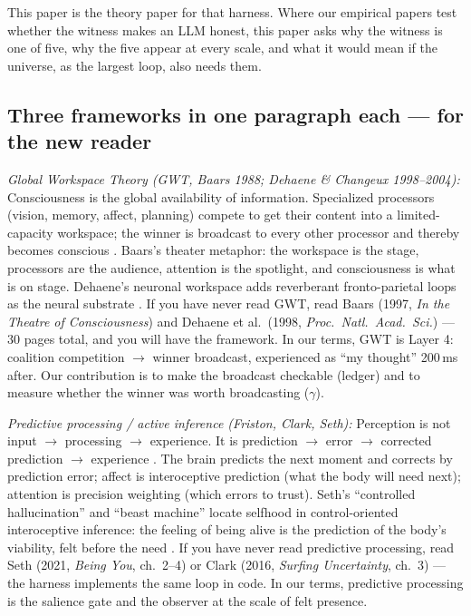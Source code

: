 \documentclass[11pt]{article}
\begin{document}
This paper is the theory paper for that harness. Where our empirical papers \citep{lin2026ahe} test whether the witness makes an LLM honest, this paper asks why the witness is one of five, why the five appear at every scale, and what it would mean if the universe, as the largest loop, also needs them.

\subsection*{Three frameworks in one paragraph each --- for the new reader}

\textit{Global Workspace Theory (GWT, Baars 1988; Dehaene \& Changeux 1998--2004):} Consciousness is the global availability of information. Specialized processors (vision, memory, affect, planning) compete to get their content into a limited-capacity workspace; the winner is broadcast to every other processor and thereby becomes conscious \citep{baars1997,atallah2026gwt}. Baars's theater metaphor: the workspace is the stage, processors are the audience, attention is the spotlight, and consciousness is what is on stage. Dehaene's neuronal workspace adds reverberant fronto-parietal loops as the neural substrate \citep{atallah2026gwt}. If you have never read GWT, read Baars (1997, \emph{In the Theatre of Consciousness}) and Dehaene et al.\ (1998, \emph{Proc.\ Natl.\ Acad.\ Sci.}) --- 30 pages total, and you will have the framework. In our terms, GWT is Layer 4: coalition competition $\to$ winner broadcast, experienced as ``my thought'' 200\,ms after. Our contribution is to make the broadcast checkable (ledger) and to measure whether the winner was worth broadcasting ($\gamma$).

\textit{Predictive processing / active inference (Friston, Clark, Seth):} Perception is not input $\to$ processing $\to$ experience. It is prediction $\to$ error $\to$ corrected prediction $\to$ experience \citep{seth2021,clark2016surfing}. The brain predicts the next moment and corrects by prediction error; affect is interoceptive prediction (what the body will need next); attention is precision weighting (which errors to trust). Seth's ``controlled hallucination'' and ``beast machine'' locate selfhood in control-oriented interoceptive inference: the feeling of being alive is the prediction of the body's viability, felt before the need \citep{seth2021}. If you have never read predictive processing, read Seth (2021, \emph{Being You}, ch.~2--4) or Clark (2016, \emph{Surfing Uncertainty}, ch.~3) --- the harness implements the same loop in code. In our terms, predictive processing is the salience gate and the observer at the scale of felt presence.
\end{document}
